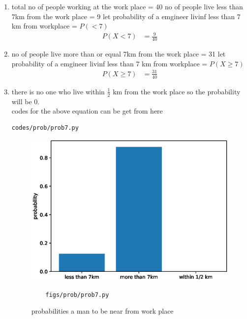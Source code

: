 \renewcommand{\theequation}{\theenumi}
\begin{enumerate}[label=\arabic*.,ref=\thesubsection.\theenumi]
\item total no of people working at the work place = 40
no of people live less than 7km from the work place = 9
let probability of a emgineer livinf less than 7 km from workplace = $P(<7)$
\begin{align}
P\left(X<7\right)&=\frac{9}{40}
\end{align}
\item no of people live more  than or equal 7km from the work place = 31
let probability of a emgineer livinf less than 7 km from workplace = $P(X \geq 7)$
\begin{align}
P\left(X \geq 7\right)&=\frac{31}{40}
\end{align}
\item there is no one who live within $\frac{1}{2}$ km from the work place so the probability will be 0.
\\
codes for the above equation can be get from here
\begin{lstlisting}
codes/prob/prob7.py
\end{lstlisting}
\begin{figure}[!ht]
	\centering
	\includegraphics[width=\columnwidth]{./figures/prob/prob7.eps}
	\caption{probabilities a man to be near from work place}
	\label{fig:bt7}
	\begin{lstlisting}
	figs/prob/prob7.py
	\end{lstlisting}
\end{figure}
\end{enumerate}